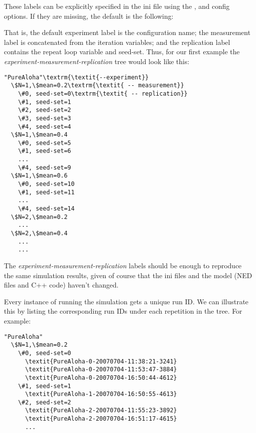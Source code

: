 These labels can be explicitly specified in the ini file using the
,  and 
config options. If they are missing, the default is the following:


That is, the default experiment label is the configuration name; the
measurement label is concatenated from the iteration variables; and the
replication label contains the repeat loop variable and seed-set.
Thus, for our first example the \textit{experiment-measurement-replication}
tree would look like this:

\begin{Verbatim}[commandchars=\\\{\}]
"PureAloha"\textrm{\textit{--experiment}}
  \$N=1,\$mean=0.2\textrm{\textit{ -- measurement}}
    \#0, seed-set=0\textrm{\textit{ -- replication}}
    \#1, seed-set=1
    \#2, seed-set=2
    \#3, seed-set=3
    \#4, seed-set=4
  \$N=1,\$mean=0.4
    \#0, seed-set=5
    \#1, seed-set=6
    ...
    \#4, seed-set=9
  \$N=1,\$mean=0.6
    \#0, seed-set=10
    \#1, seed-set=11
    ...
    \#4, seed-set=14
  \$N=2,\$mean=0.2
    ...
  \$N=2,\$mean=0.4
    ...
    ...
\end{Verbatim}

The \textit{experiment-measurement-replication} labels should be enough to
reproduce the same simulation results, given of course that the ini
files and the model (NED files and C++ code) haven't changed.

Every instance of running the simulation gets a unique run ID. We can
illustrate this by listing the corresponding run IDs under each
repetition in the tree. For example:

\begin{Verbatim}[commandchars=\\\{\}]
"PureAloha"
  \$N=1,\$mean=0.2
    \#0, seed-set=0
      \textit{PureAloha-0-20070704-11:38:21-3241}
      \textit{PureAloha-0-20070704-11:53:47-3884}
      \textit{PureAloha-0-20070704-16:50:44-4612}
    \#1, seed-set=1
      \textit{PureAloha-1-20070704-16:50:55-4613}
    \#2, seed-set=2
      \textit{PureAloha-2-20070704-11:55:23-3892}
      \textit{PureAloha-2-20070704-16:51:17-4615}
      ...
\end{Verbatim}

